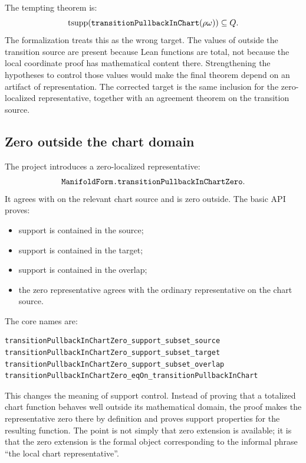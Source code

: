 \begin{remark}
The tempting theorem is:
\[
  \tsupp(\code{transitionPullbackInChart}(\rho\omega))\subseteq Q.
\]
The formalization treats this as the wrong target.  The values of
 outside the transition source are present
because Lean functions are total, not because the local coordinate proof has
mathematical content there.  Strengthening the hypotheses to control those
values would make the final theorem depend on an artifact of representation.
The corrected target is the same inclusion for the zero-localized
representative, together with an agreement theorem on the transition source.
\end{remark}

\subsection{Zero outside the chart domain}

The project introduces a zero-localized representative:
\[
\code{ManifoldForm.transitionPullbackInChartZero}.
\]
It agrees with  on the relevant chart source
and is zero outside.  The basic API proves:
\begin{itemize}
  \item support is contained in the source;
  \item support is contained in the target;
  \item support is contained in the overlap;
  \item the zero representative agrees with the ordinary representative on
  the chart source.
\end{itemize}
The core names are:
\begin{lstlisting}[language=Lean]
transitionPullbackInChartZero_support_subset_source
transitionPullbackInChartZero_support_subset_target
transitionPullbackInChartZero_support_subset_overlap
transitionPullbackInChartZero_eqOn_transitionPullbackInChart
\end{lstlisting}

This changes the meaning of support control.  Instead of proving that a
totalized chart function behaves well outside its mathematical domain, the
proof makes the representative zero there by definition and proves support
properties for the resulting function.  The point is not simply that zero
extension is available; it is that the zero extension is the formal object
corresponding to the informal phrase ``the local chart representative''.

